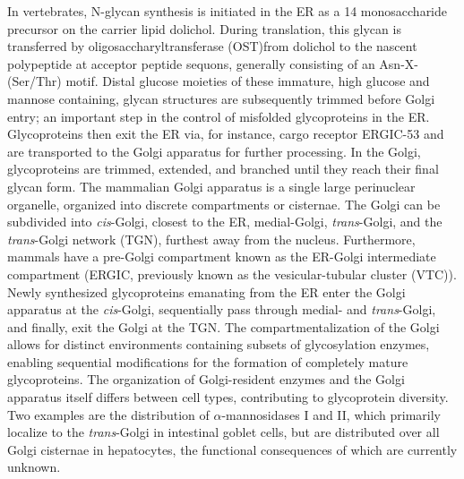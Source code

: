 In vertebrates, N-glycan synthesis is initiated in the ER as a 14 monosaccharide precursor on the carrier lipid dolichol. During translation, this glycan is transferred by oligosaccharyltransferase (OST)\cite{kornfeld_assembly_1985,lizak_x-ray_2011,ruiz-canada_cotranslational_2009}from dolichol to the nascent polypeptide at acceptor peptide sequons, generally consisting of an Asn-X-(Ser/Thr) motif\cite{kelleher_evolving_2006,schreiner_novel_1994,valliere-douglass_glutamine-linked_2010,zielinska_precision_2010}. Distal glucose moieties of these immature, high glucose and mannose containing, glycan structures are subsequently trimmed before Golgi entry; an important step in the control of misfolded glycoproteins in the ER\cite{moremen_vertebrate_2012,helenius_roles_2004,lederkremer_glycoprotein_2009}. Glycoproteins then exit the ER via, for instance, cargo receptor ERGIC-53\cite{appenzeller_lectin_1999,appenzeller-herzog_ph-induced_2004,kamiya_molecular_2008} and are transported to the Golgi apparatus for further processing. In the Golgi, glycoproteins are trimmed, extended, and branched until they reach their final glycan form. The mammalian Golgi apparatus is a single large perinuclear organelle, organized into discrete compartments or cisternae\cite{cottam_retrograde_2012,papanikou_yeast_2009,jackson_mechanisms_2009}. The Golgi can be subdivided into \emph{cis}-Golgi, closest to the ER, medial-Golgi, \emph{trans}-Golgi, and the \emph{trans}-Golgi network (TGN), furthest away from the nucleus. Furthermore, mammals have a pre-Golgi compartment known as the ER-Golgi intermediate compartment (ERGIC, previously known as the vesicular-tubular cluster (VTC))\cite{rowe_role_1998,appenzeller-herzog_er-golgi_2006}. Newly synthesized glycoproteins emanating from the ER enter the Golgi apparatus at the \emph{cis}-Golgi, sequentially pass through medial- and \emph{trans}-Golgi, and finally, exit the Golgi at the TGN. The compartmentalization of the Golgi allows for distinct environments containing subsets of glycosylation enzymes\cite{dejgaard_confocal_2007,freeze_golgi_2011,rabouille_mapping_1995,stanley_golgi_2011}, enabling sequential modifications for the formation of completely mature glycoproteins. The organization of Golgi-resident enzymes and the Golgi apparatus itself differs between cell types, contributing to glycoprotein diversity\cite{papanikou_yeast_2009,mogelsvang_predicting_2004,nilsson_overlapping_1993,ripoche_location_1994,velasco_cell_1993}. Two examples are the distribution of $\alpha$-mannosidases I and II, which primarily localize to the \emph{trans}-Golgi in intestinal goblet cells, but are distributed over all Golgi cisternae in hepatocytes, the functional consequences of which are currently unknown\cite{velasco_cell_1993}.

